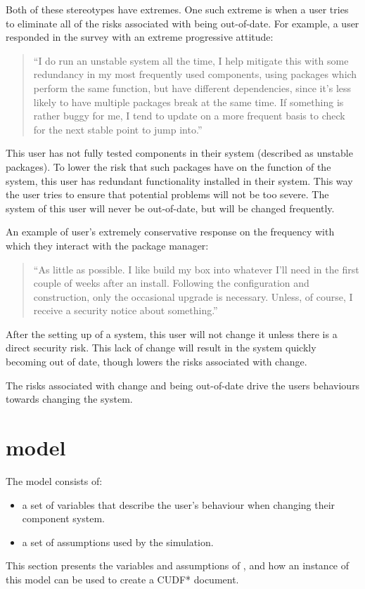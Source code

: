Both of these stereotypes have extremes.
One such extreme is when a user tries to eliminate all of the risks associated with being out-of-date.
For example, a user responded in the survey with an extreme progressive attitude:
\begin{quotation}
``I do run an unstable system all the time, I help mitigate this with some redundancy in my most frequently used components, 
using packages which perform the same function, but have different dependencies, since it's less likely to have multiple packages break at the same time. 
If something is rather buggy for me, I tend to update on a more frequent basis to check for the next stable point to jump into.''
\end{quotation}
This user has not fully tested components in their system (described as unstable packages).
To lower the risk that such packages have on the function of the system, this user has redundant functionality installed in their system.
This way the user tries to ensure that potential problems will not be too severe.
The system of this user will never be out-of-date, but will be changed frequently.

An example of user's extremely conservative response on the frequency with which they interact with the package manager:
\begin{quotation}
``As little as possible. I like build my box into whatever I'll need in the first couple of weeks after an install. 
Following the configuration and construction, only the occasional upgrade is necessary. 
Unless, of course, I receive a security notice about something.''
\end{quotation}
After the setting up of a system, this user will not change it unless there is a direct security risk.
This lack of change will result in the system quickly becoming out of date, though lowers the risks associated with change.

The risks associated with change and being out-of-date drive the users behaviours towards changing the system. 

\section{\usermodel model}
\label{sim.usermodel}
The \usermodel model consists of: 
\begin{itemize}
  \item a set of variables that describe the user's behaviour when changing their component system.
  \item a set of assumptions used by the simulation.
\end{itemize}
This section presents the variables and assumptions of \usermodel, and how an instance of this model can be used to create a CUDF* document.

